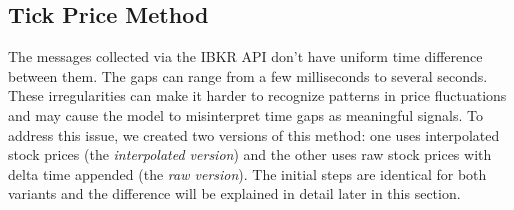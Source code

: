 \documentclass[a4paper,oneside,onecolumn,12pt]{book}
\begin{document}
	\subsection{Tick Price Method}
	The messages collected via the IBKR API don't have uniform time difference between them. The gaps can range from a few milliseconds to several seconds. These irregularities can make it harder to recognize patterns in price fluctuations and may cause the model to misinterpret time gaps as meaningful signals. To address this issue, we created two versions of this method: one uses interpolated stock prices (the \textit{interpolated version}) and the other uses raw stock prices with delta time appended (the \textit{raw version}). The initial steps are identical for both variants and the difference will be explained in detail later in this section.
\end{document}
